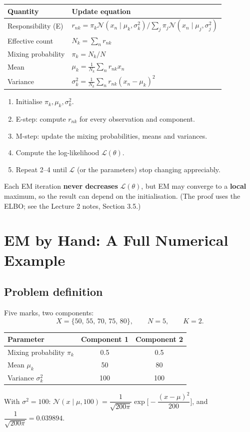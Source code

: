 \documentclass[11pt,a4paper]{article}
\newcommand{\N}{\mathcal{N}}
\newcommand{\LL}{\mathcal{L}}
\begin{document}
\begin{center}
\begin{tabular}{@{}ll@{}}
\toprule
Quantity & Update equation\\
\midrule
Responsibility (E) & $r_{nk}=\pi_k\N(x_n\mid\mu_k,\sigma_k^2)\big/\sum_j\pi_j\N(x_n\mid\mu_j,\sigma_j^2)$\\
Effective count & $N_k=\sum_nr_{nk}$\\
Mixing probability & $\pi_k=N_k/N$\\
Mean & $\mu_k=\frac1{N_k}\sum_nr_{nk}x_n$\\
Variance & $\sigma_k^2=\frac1{N_k}\sum_nr_{nk}(x_n-\mu_k)^2$\\
\bottomrule
\end{tabular}
\end{center}
\begin{enumerate}[nosep]
\item Initialise $\pi_k,\mu_k,\sigma_k^2$.
\item E-step: compute $r_{nk}$ for every observation and component.
\item M-step: update the mixing probabilities, means and variances.
\item Compute the log-likelihood $\LL(\theta)$.
\item Repeat 2--4 until $\LL$ (or the parameters) stop changing appreciably.
\end{enumerate}
\begin{keyidea}[Important]
Each EM iteration \textbf{never decreases} $\LL(\theta)$, but EM may converge to a \textbf{local} maximum, so the result can depend on the initialisation. (The proof uses the ELBO; see the Lecture 2 notes, Section 3.5.)
\end{keyidea}

\section{EM by Hand: A Full Numerical Example}

\subsection{Problem definition}

Five marks, two components:
\[
X=\{50,\,55,\,70,\,75,\,80\},\qquad N=5,\qquad K=2.
\]
\begin{center}
\begin{tabular}{@{}lcc@{}}
\toprule
Parameter & Component 1 & Component 2\\
\midrule
Mixing probability $\pi_k$ & 0.5 & 0.5\\
Mean $\mu_k$ & 50 & 80\\
Variance $\sigma_k^2$ & 100 & 100\\
\bottomrule
\end{tabular}
\end{center}
With $\sigma^2=100$:
$\N(x\mid\mu,100)=\dfrac{1}{\sqrt{200\pi}}\exp\!\Big[-\dfrac{(x-\mu)^2}{200}\Big]$, and $\dfrac{1}{\sqrt{200\pi}}=0.039894$.
\end{document}
